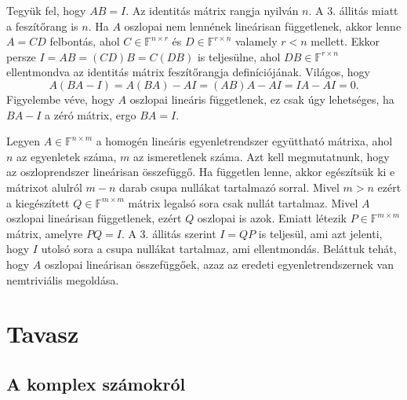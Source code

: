 \documentclass[9pt, showtrims]{memoir}
\makeatletter
\renewenvironment{proof}[1][\proofname]
    {\par\pushQED{\qed}%
    \normalfont \topsep6\p@\@plus6\p@\relax
    \trivlist
    \item[\hskip\labelsep
        \itshape
    #1\@addpunct{:}]\ignorespaces}
    {\popQED\endtrivlist\@endpefalse}
\theoremstyle{plain}
\theoremstyle{remark}
\theoremstyle{definition}
\makeatother
\begin{document}
\begin{proof}[3.\Rightarrow 4.]
    Tegyük fel, hogy $AB=I$.
    Az identitás mátrix rangja nyilván $n$.
    A 3. állitás miatt a feszítőrang is $n$.
    Ha $A$ oszlopai nem lennének lineárisan függetlenek,
    akkor lenne $A=CD$ felbontás, ahol $C\in\mathbb{F}^{n \times r}$ és $D\in\mathbb{F}^{r\times n}$ valamely $r<n$ mellett.
    Ekkor persze $I=AB=\left( CD \right)B=C\left( DB \right)$ is teljesülne, 
    ahol $DB\in\mathbb{F}^{r\times n}$ ellentmondva az identitás mátrix feszítőrangja definíciójának.
    Világos, hogy
    \[
        A\left( BA-I \right)=
        A\left( BA \right)-AI=
        \left( AB \right)A-AI=IA-AI=0.
    \]
    Figyelembe véve, hogy $A$ oszlopai lineáris függetlenek, ez csak úgy lehetséges, ha $BA-I$ a zéró mátrix, ergo $BA=I$.
\end{proof}
\begin{proof}[4.\Rightarrow 1.]
    Legyen $A\in\mathbb{F}^{n\times m}$ a homogén lineáris egyenletrendszer együttható mátrixa,
    ahol $n$ az egyenletek száma, $m$ az ismeretlenek száma.
    Azt kell megmutatnunk, hogy az oszloprendszer lineárisan összefüggő.
    Ha független lenne, akkor
    egészítsük ki e mátrixot alulról $m-n$ darab csupa nullákat tartalmazó sorral.
    Mivel $m>n$ ezért a kiegészített $Q\in\mathbb{F}^{m\times m}$ mátrix legalsó sora csak nullát tartalmaz.
    Mivel $A$ oszlopai lineárisan függetlenek, ezért $Q$ oszlopai is azok.
    Emiatt létezik $P\in\mathbb{F}^{m\times m}$ mátrix, amelyre $PQ=I$.
    A 3. állitás szerint $I=QP$ is teljesül, 
    ami azt jelenti, hogy $I$ utolsó sora a csupa nullákat tartalmaz, ami ellentmondás.
    Beláttuk tehát, hogy $A$ oszlopai lineárisan összefüggőek, azaz az eredeti egyenletrendszernek van nemtriviális megoldása.
\end{proof}

\part{Tavasz}
\appendix
\renewcommand{\appendixpagename}{Függelékek}\renewcommand{\appendixtocname}{\appendixpagename}
\appendixpage
\chapter{A komplex számokról}
\end{document}
